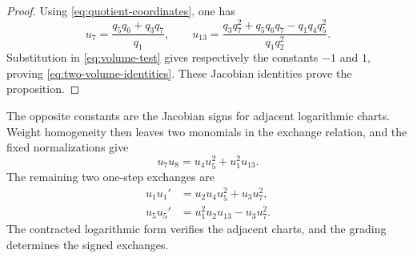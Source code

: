 \documentclass[11pt,reqno]{amsart}
\numberwithin{equation}{section}
\theoremstyle{remark}
\begin{document}
\begin{proof}
Using \eqref{eq:quotient-coordinates}, one has
\[ u_7=\frac{q_5q_6+q_3q_7}{q_1}, \qquad u_{13}=\frac{q_3q_7^2+q_5q_6q_7-q_1q_4q_5^2}{q_1q_2^2}. \]
Substitution in \eqref{eq:volume-test} gives respectively the constants
$-1$ and $1$, proving \eqref{eq:two-volume-identities}.  These Jacobian identities prove the proposition.
\end{proof}

The opposite constants are the Jacobian signs for adjacent logarithmic
charts.  Weight homogeneity then leaves two monomials in the
exchange relation, and the fixed normalizations give
\[ u_7u_8=u_4u_5^2+u_1^2u_{13}. \]
The remaining two one-step exchanges are
\begin{equation}
\label{eq:first-two-signed-exchanges}
 \begin{aligned}
 u_1u_1'&=u_2u_4u_5^2+u_3u_7^2,\\
 u_5u_5'&=u_1^2u_2u_{13}-u_3u_7^2.
 \end{aligned}
\end{equation}
The contracted logarithmic form verifies the adjacent charts, and the grading
determines the signed exchanges.
\end{document}

